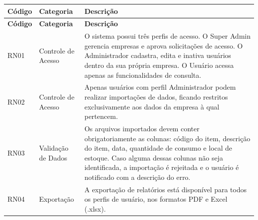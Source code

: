 \documentclass[12pt,a4paper]{article}
\begin{document}
\begin{longtable}{p{} p{} p{}}
    \toprule
    \textbf{Código} & \textbf{Categoria}  & \textbf{Descrição}                                                                                                                                                                                                                                                               \\
    \midrule
    \endfirsthead
    \toprule
    \textbf{Código} & \textbf{Categoria}  & \textbf{Descrição}                                                                                                                                                                                                                                                               \\
    \midrule
    \endhead

    RN01            & Controle de Acesso  & O sistema possui três perfis de acesso. O Super Admin gerencia empresas e aprova solicitações de acesso. O Administrador cadastra, edita e inativa usuários dentro da sua própria
    empresa. O Usuário acessa apenas as funcionalidades de consulta.                                                                                                                                                                                                                                                         \\\midrule

    RN02            & Controle de Acesso  & Apenas usuários com perfil Administrador podem realizar importações de dados, ficando restritos exclusivamente aos dados da empresa à qual pertencem.                                                                                                                            \\\midrule

    RN03            & Validação de Dados  & Os arquivos importados devem conter obrigatoriamente as colunas: código do item, descrição do item, data, quantidade de consumo e local de estoque. Caso alguma dessas colunas não seja identificada, a importação é rejeitada e o usuário é notificado com a descrição do erro. \\\midrule

    RN04            & Exportação          & A exportação de relatórios está disponível para todos os perfis de usuário, nos formatos PDF e Excel (.xlsx).                                                                                                                                                                    \\\midrule


\end{longtable}
\end{document}
